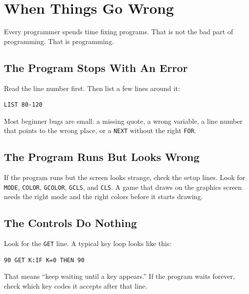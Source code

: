 \chapter*{When Things Go Wrong}
{}

Every programmer spends time fixing programs. That is not the bad part of
programming. That is programming.

\section*{The Program Stops With An Error}
{}

Read the line number first. Then list a few lines around it:

\begin{lstlisting}
LIST 80-120
\end{lstlisting}

Most beginner bugs are small: a missing quote, a wrong variable, a line number
that points to the wrong place, or a \texttt{NEXT} without the right
\texttt{FOR}.

\section*{The Program Runs But Looks Wrong}
{}

If the program runs but the screen looks strange, check the setup lines. Look
for \texttt{MODE}, \texttt{COLOR}, \texttt{GCOLOR}, \texttt{GCLS}, and
\texttt{CLS}. A game that draws on the graphics screen needs the right mode and
the right colors before it starts drawing.

\section*{The Controls Do Nothing}
{}

Look for the \texttt{GET} line. A typical key loop looks like this:

\begin{lstlisting}
90 GET K:IF K=0 THEN 90
\end{lstlisting}

That means ``keep waiting until a key appears.'' If the program waits forever,
check which key codes it accepts after that line.

